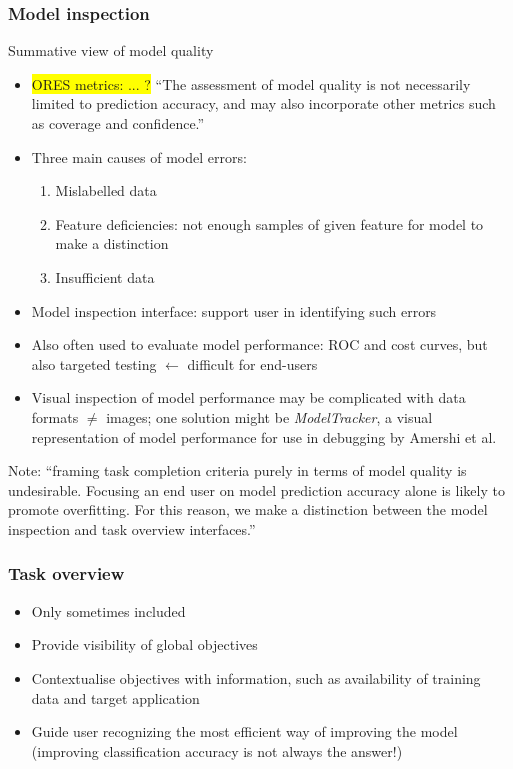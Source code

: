 \documentclass[12pt,a4paper]{article}
\begin{document}
\subsubsection{Model inspection}
\begin{description}
\item Summative view of model quality
\end{description}
\begin{itemize}
\item \colorbox{yellow}{ORES metrics: ... ?} ``The assessment of model quality is not necessarily limited to prediction accuracy, and may also incorporate other metrics such as coverage and confidence.''
\item Three main causes of model errors:
\begin{enumerate}
\item Mislabelled data
\item Feature deficiencies: not enough samples of given feature for model to make a distinction
\item Insufficient data
\end{enumerate}
\item Model inspection interface: support user in identifying such errors
\item Also often used to evaluate model performance: ROC and cost curves, but also targeted testing $\leftarrow$ difficult for end-users
\item Visual inspection of model performance may be complicated with data formats $\neq$ images; one solution might be \textit{ModelTracker}, a visual representation of model performance for use in debugging by Amershi et al.
\end{itemize}
\begin{description}
\item Note: ``framing task completion criteria purely in terms of model quality is undesirable. Focusing an end user on model prediction accuracy alone is likely to promote overfitting. For this reason, we make a distinction between the model inspection and task overview interfaces.''
\end{description}
\subsubsection{Task overview}
\begin{itemize}
\item Only sometimes included
\item Provide visibility of global objectives
\item Contextualise objectives with information, such as availability of training data and target application
\item Guide user recognizing the most efficient way of improving the model (improving classification accuracy is not always the answer!)
\end{itemize}
\end{document}
